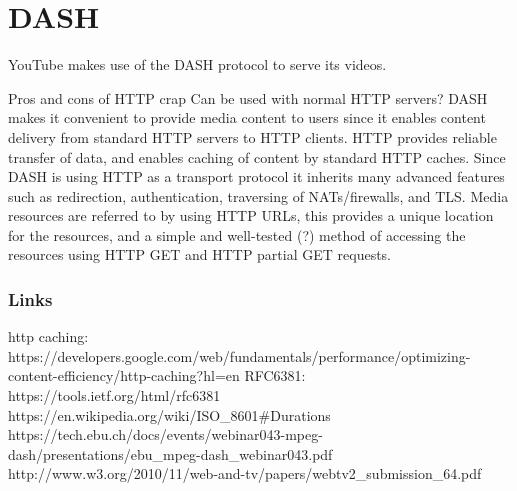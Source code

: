 \section{DASH}

YouTube makes use of the DASH protocol to serve its videos.

Pros and cons of HTTP crap Can be used with normal HTTP servers? DASH
makes it convenient to provide media content to users since it enables
content delivery from standard HTTP servers to HTTP clients. HTTP
provides reliable transfer of data, and enables caching of content by
standard HTTP caches. Since DASH is using HTTP as a transport protocol
it inherits many advanced features such as redirection, authentication,
traversing of NATs/firewalls, and TLS. Media resources are referred to
by using HTTP URLs, this provides a unique location for the resources,
and a simple and well-tested (?) method of accessing the resources using
HTTP GET and HTTP partial GET requests.



\subsubsection{Links}\label{links}

http caching:
https://developers.google.com/web/fundamentals/performance/optimizing-content-efficiency/http-caching?hl=en
RFC6381: https://tools.ietf.org/html/rfc6381
https://en.wikipedia.org/wiki/ISO\_8601\#Durations
https://tech.ebu.ch/docs/events/webinar043-mpeg-dash/presentations/ebu\_mpeg-dash\_webinar043.pdf
http://www.w3.org/2010/11/web-and-tv/papers/webtv2\_submission\_64.pdf

